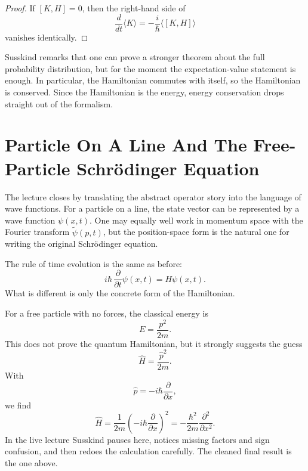 \begin{proof}
If $[K,H]=0$, then the right-hand side of
\[
\frac{d}{dt}\langle K\rangle=-\frac{i}{\hbar}\langle[K,H]\rangle
\]
vanishes identically.
\end{proof}

Susskind remarks that one can prove a stronger theorem about the full probability distribution, but for the moment the expectation-value statement is enough. In particular, the Hamiltonian commutes with itself, so the Hamiltonian is conserved. Since the Hamiltonian is the energy, energy conservation drops straight out of the formalism.

\section{Particle On A Line And The Free-Particle Schr\"odinger Equation}

The lecture closes by translating the abstract operator story into the language of wave functions. For a particle on a line, the state vector can be represented by a wave function $\psi(x,t)$. One may equally well work in momentum space with the Fourier transform $\tilde\psi(p,t)$, but the position-space form is the natural one for writing the original Schr\"odinger equation.

The rule of time evolution is the same as before:
\begin{equation}
i\hbar\,\frac{\partial}{\partial t}\psi(x,t)=H\psi(x,t).
\end{equation}
What is different is only the concrete form of the Hamiltonian.

For a free particle with no forces, the classical energy is
\begin{equation}
E=\frac{p^2}{2m}.
\end{equation}
This does not prove the quantum Hamiltonian, but it strongly suggests the guess
\begin{equation}
\hat H=\frac{\hat p^2}{2m}.
\end{equation}
With
\begin{equation}
\hat p=-i\hbar\frac{\partial}{\partial x},
\end{equation}
we find
\begin{equation}
\hat H
=
\frac{1}{2m}
\left(-i\hbar\frac{\partial}{\partial x}\right)^2
=
-\frac{\hbar^2}{2m}\frac{\partial^2}{\partial x^2}.
\end{equation}
In the live lecture Susskind pauses here, notices missing factors and sign confusion, and then redoes the calculation carefully. The cleaned final result is the one above.

